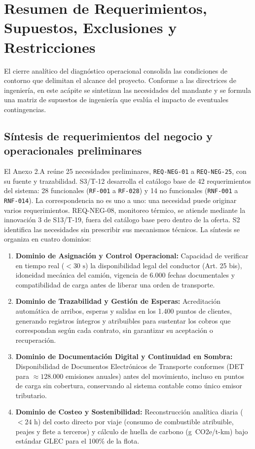\section{Resumen de Requerimientos, Supuestos, Exclusiones y Restricciones}\label{sec:2-requerimientos}

El cierre analítico del diagnóstico operacional consolida las condiciones de contorno que delimitan el alcance del proyecto. Conforme a las directrices de ingeniería, en este acápite se sintetizan las necesidades del mandante y se formula una matriz de supuestos de ingeniería que evalúa el impacto de eventuales contingencias.

\subsection{Síntesis de requerimientos del negocio y operacionales preliminares}\label{sec:2-req-sintesis}

El Anexo 2.A reúne 25 necesidades preliminares, \texttt{REQ-NEG-01} a \texttt{REQ-NEG-25}, con su fuente y trazabilidad. S3/T-12 desarrolla el catálogo base de 42 requerimientos del sistema: 28 funcionales (\texttt{RF-001} a \texttt{RF-028}) y 14 no funcionales (\texttt{RNF-001} a \texttt{RNF-014}). La correspondencia no es uno a uno: una necesidad puede originar varios requerimientos. REQ-NEG-08, monitoreo térmico, se atiende mediante la innovación 3 de S13/T-19, fuera del catálogo base pero dentro de la oferta. S2 identifica las necesidades sin prescribir sus mecanismos técnicos. La síntesis se organiza en cuatro dominios:

\begin{enumerate}
  \item \textbf{Dominio de Asignación y Control Operacional:} Capacidad de verificar en tiempo real ($< 30\text{ s}$) la disponibilidad legal del conductor (Art. 25 bis), idoneidad mecánica del camión, vigencia de 6.000 fechas documentales y compatibilidad de carga antes de liberar una orden de transporte.
  \item \textbf{Dominio de Trazabilidad y Gestión de Esperas:} Acreditación automática de arribos, esperas y salidas en los 1.400 puntos de clientes, generando registros íntegros y atribuibles para sustentar los cobros que correspondan según cada contrato, sin garantizar su aceptación o recuperación.
  \item \textbf{Dominio de Documentación Digital y Continuidad en Sombra:} Disponibilidad de Documentos Electrónicos de Transporte conformes (DET para $\approx 128.000$ emisiones anuales) antes del movimiento, incluso en puntos de carga sin cobertura, conservando al sistema contable como único emisor tributario.
  \item \textbf{Dominio de Costeo y Sostenibilidad:} Reconstrucción analítica diaria ($< 24\text{ h}$) del costo directo por viaje (consumo de combustible atribuible, peajes y flete a terceros) y cálculo de huella de carbono (g~CO2e/t-km) bajo estándar GLEC para el 100\% de la flota.
\end{enumerate}

